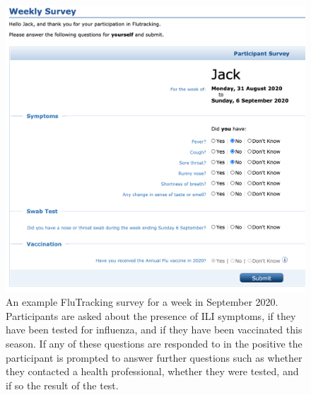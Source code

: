 \begin{figure}[h!]
	\centering
	\includegraphics[scale=0.5]{Figs/FluTrackingSurvey.png}
	\caption{An example FluTracking survey for a week in September 2020. Participants are asked about the presence of ILI symptoms, if they have been tested for influenza, and if they have been vaccinated this season. If any of these questions are responded to in the positive the participant is prompted to answer further questions such as whether they contacted a health professional, whether they were tested, and if so the result of the test.}
	\label{fig:FluTracking Survey}
\end{figure}

